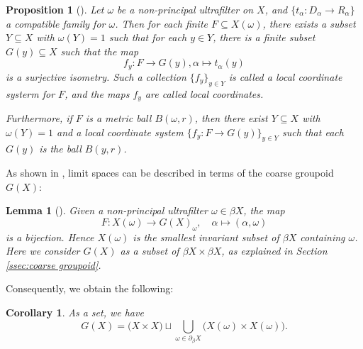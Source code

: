 \documentclass[12pt, a4paper]{amsart}
\numberwithin{equation}{section}
\newtheorem{cor}[thm]{Corollary}
\newtheorem{lem}[thm]{Lemma}
\newtheorem{prop}[thm]{Proposition}
\theoremstyle{definition}
\theoremstyle{remark}
\newtheorem{rem}[thm]{Remark}
\begin{document}
\begin{prop}[{\cite[Proposition 3.10]{SW17}}]\label{prop:local geometry}
Let $\omega$ be a non-principal ultrafilter on $X$, and $\{t_\alpha:D_\alpha \to R_\alpha\}$ a compatible family for $\omega$. Then for each finite $F \subseteq X(\omega)$, there exists a subset $Y \subseteq X$ with $\omega(Y)=1$ such that for each $y\in Y$, there is a finite subset $G(y) \subseteq X$ such that the map
$$f_y: F \to G(y), \alpha \mapsto t_\alpha(y)$$
is a surjective isometry. Such a collection $\{f_y\}_{y\in Y}$ is called a \emph{local coordinate systerm } for $F$, and the maps $f_y$ are called \emph{local coordinates}.

Furthermore, if $F$ is a metric ball $B(\omega,r)$, then there exist $Y \subseteq X$ with $\omega(Y)=1$ and a local coordinate system $\{f_y: F \to G(y)\}_{y\in Y}$ such that each $G(y)$ is the ball $B(y,r)$.
\end{prop}



As shown in \cite[Appendix C]{SW17}, limit spaces can be described in terms of the coarse groupoid $G(X)$:

\begin{lem}[{\cite[Lemma C.3]{SW17}}]\label{lem:limit space via coarse groupoids}
Given a non-principal ultrafilter $ \omega \in \beta X$, the map
$$F : X(\omega) \rightarrow G(X)_\omega, \quad \alpha \mapsto (\alpha, \omega)$$
is a bijection. Hence $X(\omega)$ is the smallest invariant subset of $\beta X$ containing $\omega$. Here we consider $G(X)$ as a subset of $\beta X \times \beta X$, as explained in Section \ref{ssec:coarse groupoid}.
\end{lem}

Consequently, we obtain the following:

\begin{cor}\label{cor:char for G(X)}
As a set, we have
\[
G(X) = \big(X \times X\big) \sqcup \bigcup_{\omega \in \partial_\beta X} \big( X(\omega) \times X(\omega) \big).
\]
\end{cor}

\end{document}
